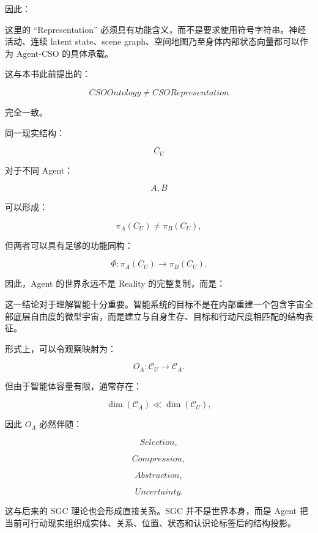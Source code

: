 因此：

\begin{statementbox}
\centering
{}
\end{statementbox}

这里的 ``Representation'' 必须具有功能含义，而不是要求使用符号字符串。神经活动、连续 latent state、scene graph、空间地图乃至身体内部状态向量都可以作为 Agent-CSO 的具体承载。

这与本书此前提出的：

\[
CSOOntology
\neq
CSORepresentation
\]

完全一致。

同一现实结构：

\[
C_U
\]

对于不同 Agent：

\[
A,B
\]

可以形成：

\[
\pi_A(C_U)
\neq
\pi_B(C_U),
\]

但两者可以具有足够的功能同构：

\[
\Phi:
\pi_A(C_U)
\rightarrow
\pi_B(C_U).
\]

因此，Agent 的世界永远不是 Reality 的完整复制，而是：

\begin{statementbox}
\centering
{}
\end{statementbox}

这一结论对于理解智能十分重要。智能系统的目标不是在内部重建一个包含宇宙全部底层自由度的微型宇宙，而是建立与自身生存、目标和行动尺度相匹配的结构表征。

形式上，可以令观察映射为：

\[
O_A:
\mathcal{C}_{U}
\rightarrow
\mathcal{C}_{A}.
\]

但由于智能体容量有限，通常存在：

\[
\dim(\mathcal{C}_{A})
\ll
\dim(\mathcal{C}_{U}),
\]

因此 $O_A$ 必然伴随：

\[
Selection,
\]

\[
Compression,
\]

\[
Abstraction,
\]

\[
Uncertainty.
\]

这与后来的 SGC 理论也会形成直接关系。SGC 并不是世界本身，而是 Agent 把当前可行动现实组织成实体、关系、位置、状态和认识论标签后的结构投影。

